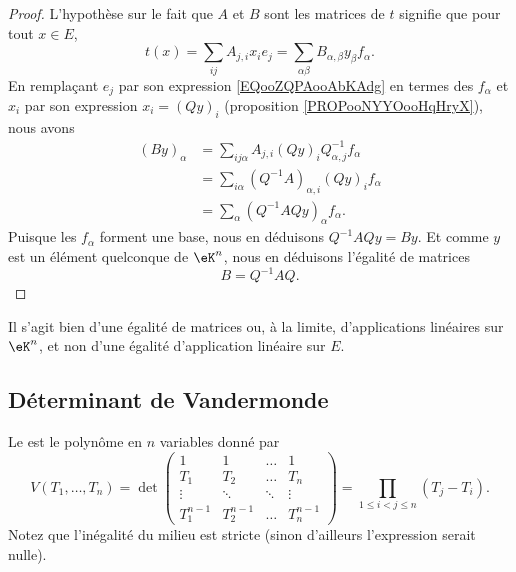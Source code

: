 \begin{proof}
	L'hypothèse sur le fait que \( A\) et \( B\) sont les matrices de \( t\) signifie que pour tout \( x\in E\),
	\begin{equation}
		t(x)=\sum_{ij}A_{j,i}x_ie_j=\sum_{\alpha\beta}B_{\alpha,\beta}y_{\beta}f_{\alpha}.
	\end{equation}
	En remplaçant \( e_j\) par son expression \eqref{EQooZQPAooAbKAdg} en termes des \( f_{\alpha}\) et \( x_i\) par son expression \( x_i=(Qy)_i\) (proposition \ref{PROPooNYYOooHqHryX}), nous avons
	\begin{subequations}
		\begin{align}
			(By)_{\alpha} & =\sum_{ij\alpha}A_{j,i}(Qy)_iQ^{-1}_{\alpha, j}f_{\alpha} \\
			              & =\sum_{i \alpha}(Q^{-1}A)_{\alpha, i}(Qy)_i f_{\alpha}    \\
			              & =\sum_{\alpha}(Q^{-1} AQy)_{\alpha}f_{\alpha}.
		\end{align}
	\end{subequations}
	Puisque les \( f_{\alpha}\) forment une base, nous en déduisons \( Q^{-1}AQy=By\). Et comme \( y\) est un élément quelconque de \( \eK^n\), nous en déduisons l'égalité de matrices
	\begin{equation}    \label{ooWKTYooOJfclT}
		B=Q^{-1}AQ.
	\end{equation}
\end{proof}
Il s'agit bien d'une égalité de matrices ou, à la limite, d'applications linéaires sur \( \eK^n\), et non d'une égalité d'application linéaire sur \( E\).

\subsection{Déterminant de Vandermonde}

\begin{proposition}  \label{PropnuUvtj}
	Le  est le polynôme en \( n\) variables donné par
	\begin{equation}
		V(T_1,\ldots, T_n)=\det\begin{pmatrix}
			1         & 1         & \ldots & 1         \\
			T_1       & T_2       & \ldots & T_n       \\
			\vdots    & \ddots    & \ddots & \vdots    \\
			T_1^{n-1} & T_2^{n-1} & \ldots & T_n^{n-1}
		\end{pmatrix}=\prod_{1\leq i<j\leq n}(T_j-T_i).
	\end{equation}
	Notez que l'inégalité du milieu est stricte (sinon d'ailleurs l'expression serait nulle).
\end{proposition}

